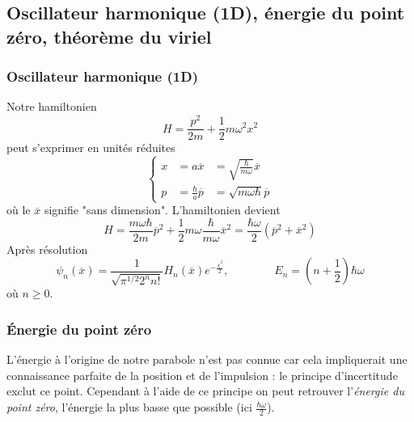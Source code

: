 		

	\subsection{Oscillateur harmonique (1D), énergie du point zéro, théorème du viriel}
		\subsubsection{Oscillateur harmonique (1D)}	
		Notre hamiltonien
		\begin{equation}
		H = \frac{p^2}{2m}+\frac{1}{2}m\omega^2x^2
		\end{equation}
		peut s'exprimer en unités réduites
		\begin{equation}
		\left\{\begin{array}{lll}
		x &= a\overline{x} &= \sqrt{\frac{\hbar}{m\omega}}\overline{x}\\
		p &= \frac{\hbar}{a}\overline{p} &= \sqrt{m\omega\hbar}\overline{p}
		\end{array}\right.
		\end{equation}
		où le $\overline{x}$ signifie "sans dimension". L’hamiltonien devient
		\begin{equation}
		H = \frac{m\omega\hbar}{2m}\overline{p}^2+\frac{1}{2}m\omega\frac{\hbar}{m\omega}\overline{x}^2
		= \frac{\hbar\omega}{2}(\overline{p}^2+\overline{x}^2)
		\end{equation}
		Après résolution
		\begin{equation}
		\psi_n(\overline{x}) = \dfrac{1}{\sqrt{\pi^{1/2}2^nn!}}H_n(\overline{x})e^{-\frac{\overline{x}^2}{2}},
		\qquad\qquad E_n = \left(n+\frac{1}{2}\right)\hbar\omega
		\end{equation}
		où $n\geq0$.
		
		
		\subsubsection{Énergie du point zéro}		
		L'énergie à l'origine de notre parabole n'est pas connue car cela impliquerait une connaissance 
		parfaite de la position et de l'impulsion : le principe d'incertitude exclut ce point. Cependant 
		à l'aide de ce principe on peut retrouver l'\textit{énergie du point zéro}, l'énergie la plus 
		basse que possible (ici $\frac{\hbar\omega}{2}$).\\
		
